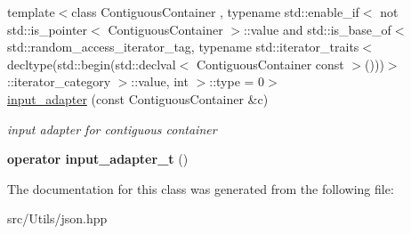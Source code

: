 \begin{DoxyCompactItemize}
\mbox{\label{classnlohmann_1_1detail_1_1input__adapter_a6f92fe82cb49a508dbfb297c5630cc7f}} 
{\footnotesize template$<$class Contiguous\+Container , typename std\+::enable\+\_\+if$<$ not std\+::is\+\_\+pointer$<$ Contiguous\+Container $>$\+::value and std\+::is\+\_\+base\+\_\+of$<$ std\+::random\+\_\+access\+\_\+iterator\+\_\+tag, typename std\+::iterator\+\_\+traits$<$ decltype(std\+::begin(std\+::declval$<$ Contiguous\+Container const $>$()))$>$\+::iterator\+\_\+category $>$\+::value, int $>$\+::type  = 0$>$ }\\\mbox{\hyperlink{classnlohmann_1_1detail_1_1input__adapter_a6f92fe82cb49a508dbfb297c5630cc7f}{input\+\_\+adapter}} (const Contiguous\+Container \&c)
\begin{DoxyCompactList}\small\item\em input adapter for contiguous container \end{DoxyCompactList}\item 
\mbox{\label{classnlohmann_1_1detail_1_1input__adapter_a4ef04b9490247fc38f3d1c2a9e18789b}} 
{\bfseries operator input\+\_\+adapter\+\_\+t} ()
\end{DoxyCompactItemize}


The documentation for this class was generated from the following file\+:\begin{DoxyCompactItemize}
\item 
src/\+Utils/json.\+hpp\end{DoxyCompactItemize}
